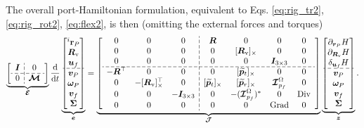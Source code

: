 \documentclass{svjour3}                     %
\DeclareMathOperator*{\Grad}{Grad}
\DeclareMathOperator*{\Div}{Div}
\newcommand{\crmat}[1]{\ensuremath{[#1]_{\times}}}
\begin{document}
The overall port-Hamiltonian formulation, equivalent to Eqs. \eqref{eq:rig_tr2}, \eqref{eq:rig_rot2}, \eqref{eq:flex2}, is then (omitting the external forces and torques)
\begin{equation}
\label{eq:ph_mfd_all}
\setlength{\dashlinegap}{2pt}
\underbrace{
	{\left[ \begin{array}{c:c}
		\bm{I} & 0 \\
		\hdashline
		0 & \bm{\mathcal{M}} \\
		\end{array} \right]}
}_{\bm{\mathcal{E}}}
\diff{}{t}
\underbrace{\begin{bmatrix}
	^i \mathbf{r}_P \\ \bm{R}_{\text{v}} \\ \bm{u}_f \\\hdashline  \bm{v}_P \\ \bm\omega_P  \\ \bm{v}_f  \\ \bm\Sigma \\
	\end{bmatrix}}_{\bm{e}} = 
\underbrace{
	{\left[ \begin{array}{ccc:cccc}
		0 & 0 & 0 &  \bm{R} & 0 & 0 & 0 \\
		0 & 0 & 0 & 0 & \crmat{\bm{R}_{\text{v}}} & 0 & 0 \\
		0 & 0 & 0 & 0 & 0 & \bm{I}_{3\times 3} & 0  \\ 
		\hdashline
		-\bm{R}^\top & 0 & 0 & 0 & \crmat{\widetilde{\bm{p}}_t} & 0 & 0 \\
		0 & -\crmat{\bm{R}_{\text{v}}}^\top & 0 & \crmat{\widetilde{\bm{p}}_t} & \crmat{\widetilde{\bm{p}}_r} & \bm{\mathcal{I}}_{p_f}^\Omega & 0 \\
		0 & 0 & -\bm{I}_{3\times 3} & 0 & -(\bm{\mathcal{I}}_{p_f}^\Omega)^* & 0 & \Div \\
		0 & 0 & 0 & 0 & 0 & \Grad & 0 \\
		\end{array} \right]}
}_{\bm{\mathcal{J}}}
\underbrace{\begin{bmatrix}
	\partial_{\bm{r}_P}H \\ \partial_{\bm{R}_\text{v}}H \\ \delta_{\bm{u}_f} H \\\hdashline  \bm{v}_P \\ \bm\omega_P  \\ \bm{v}_f  \\ \bm\Sigma \\
	\end{bmatrix}}_{\bm{z}}.
\end{equation} 
\end{document}
